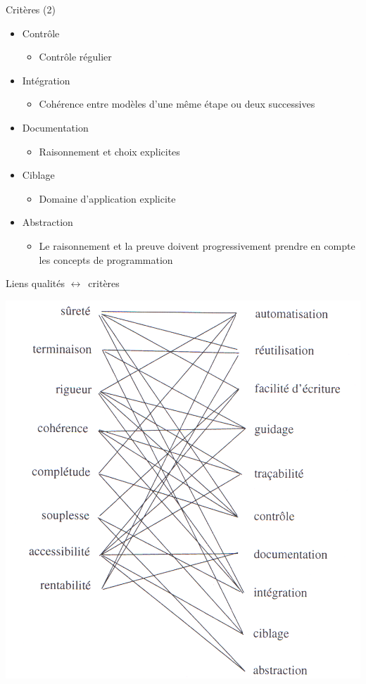 \documentclass[14pt]{beamer}
\begin{document}
\begin{framentitle}{Critères (2)}
    \begin{itemize}
        \item Contrôle
            \begin{itemize}
                \item Contrôle régulier
            \end{itemize}
        \item Intégration
            \begin{itemize}
                \item Cohérence entre modèles d'une même étape ou deux
                    successives
            \end{itemize}
        \item Documentation
            \begin{itemize}
                \item Raisonnement et choix explicites
            \end{itemize}
        \item Ciblage
            \begin{itemize}
                \item Domaine d'application explicite
            \end{itemize}
        \item Abstraction
            \begin{itemize}
                \item Le raisonnement et la preuve doivent progressivement
                    prendre en compte les concepts de programmation
            \end{itemize}
    \end{itemize}
\end{framentitle}

\begin{framentitle}{Liens qualités $\leftrightarrow$\ critères}
    \begin{center}
        \includegraphics[width=.6\textwidth]{fig6.png}
    \end{center}
\end{framentitle}
\end{document}

